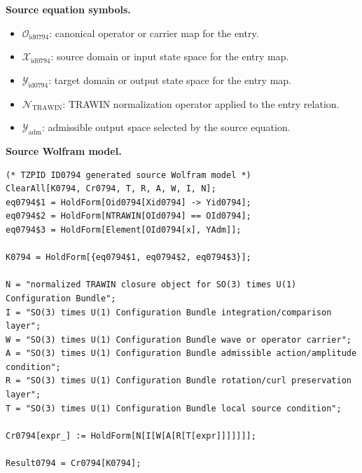 \begin{minipage}[t]{0.49\linewidth}
\begingroup
\small
\raggedright
\textbf{Source equation symbols.}\par
\begin{itemize}[leftmargin=1.35em,itemsep=1pt,topsep=1pt,parsep=0pt]
    \item $\mathcal{O}_{\mathrm{id0794}}$: canonical operator or carrier map for the entry.
    \item $\mathcal{X}_{\mathrm{id0794}}$: source domain or input state space for the entry map.
    \item $\mathcal{Y}_{\mathrm{id0794}}$: target domain or output state space for the entry map.
    \item $\mathcal{N}_{\mathrm{TRAWIN}}$: TRAWIN normalization operator applied to the entry relation.
    \item $\mathcal{Y}_{\mathrm{adm}}$: admissible output space selected by the source equation.
\end{itemize}
\endgroup
\end{minipage}\hfill
\begin{minipage}[t]{0.47\linewidth}
\begingroup
\scriptsize
\raggedright
\textbf{Source Wolfram model.}\par
\begin{Verbatim}[fontsize=\tiny,breaklines=true,breakanywhere=true]
(* TZPID ID0794 generated source Wolfram model *)
ClearAll[K0794, Cr0794, T, R, A, W, I, N];
eq0794$1 = HoldForm[Oid0794[Xid0794] -> Yid0794];
eq0794$2 = HoldForm[NTRAWIN[OId0794] == OId0794];
eq0794$3 = HoldForm[Element[OId0794[x], YAdm]];

K0794 = HoldForm[{eq0794$1, eq0794$2, eq0794$3}];

N = "normalized TRAWIN closure object for SO(3) times U(1) Configuration Bundle";
I = "SO(3) times U(1) Configuration Bundle integration/comparison layer";
W = "SO(3) times U(1) Configuration Bundle wave or operator carrier";
A = "SO(3) times U(1) Configuration Bundle admissible action/amplitude condition";
R = "SO(3) times U(1) Configuration Bundle rotation/curl preservation layer";
T = "SO(3) times U(1) Configuration Bundle local source condition";

Cr0794[expr_] := HoldForm[N[I[W[A[R[T[expr]]]]]]];

Result0794 = Cr0794[K0794];
\end{Verbatim}
\endgroup
\end{minipage}

